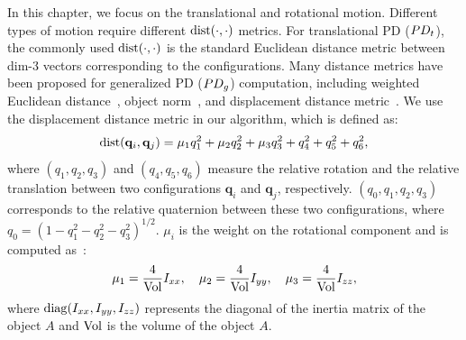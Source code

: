 In this chapter, we focus on the translational and rotational motion. Different types of motion require different $\operatorname{dist}(\cdot,\cdot)$ metrics.
For translational PD ($PD_t$), the commonly used $\operatorname{dist}(\cdot, \cdot)$ is the standard Euclidean distance metric between dim-3 vectors corresponding to the configurations. Many distance metrics have been proposed for generalized PD ($PD_g$) computation, including weighted Euclidean
distance~\cite{Wang:CBO:2012}, object norm~\cite{Je:2012:PRP}, and displacement distance metric~\cite{Zhang:2007:AFP}. We use the displacement distance metric in our algorithm, which is defined as:
\begin{align}
\label{eq:PDgmetric}
\operatorname{dist}(\mathbf q_i, \mathbf q_j) = \mu_1 q_1^2 + \mu_2 q_2^2 + \mu_3 q_3^2 + q_4^2 + q_5^2 + q_6^2,
\end{align}
where $(q_1, q_2, q_3)$ and $(q_4, q_5, q_6)$ measure the relative rotation and the relative translation between two configurations $\mathbf q_i$ and $\mathbf q_j$, respectively. $(q_0, q_1, q_2, q_3)$ corresponds to the relative quaternion between these two configurations, where $q_0=(1- q_1^2-q_2^2-q_3^2)^{1/2}$. $\mu_i$ is the weight on the rotational component and is computed as~\cite{Zhang:2007:AFP}:
\begin{align}
\label{eq:PDgmetricMu}
\mu_1 = \frac{4}{\vol}I_{xx}, \ \ \  \mu_2 = \frac{4}{\vol}I_{yy}, \ \ \  \mu_3 = \frac{4}{\vol}I_{zz},
\end{align}
where $\diag(I_{xx}, I_{yy}, I_{zz})$ represents the diagonal of the inertia matrix of the object $A$ and $\operatorname{Vol}$ is the volume of the object $A$. 


